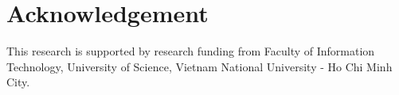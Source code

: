 \documentclass[runningheads]{llncs}
\begin{document}

\section*{Acknowledgement}
This research is supported by research funding from Faculty of Information Technology, University of Science, Vietnam National University - Ho Chi Minh City.
%
%
%


\end{document}
